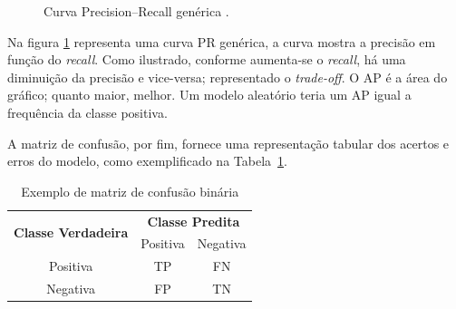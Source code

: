 \documentclass[
    12pt,                %
    openright,           %
    oneside,             %
    a4paper,             %
    brazil               %
]{abntex2}
\begin{document}
\begin{figure}[H]
    \centering
    \caption{Curva Precision–Recall genérica .}
    \label{fig:pr_curve_nv}
\end{figure}


Na figura \ref{fig:pr_curve_nv} representa uma curva PR genérica, a curva mostra a precisão em função do \textit{recall}. Como ilustrado,
conforme aumenta-se o \textit{recall}, há uma diminuição da precisão e vice-versa; representado o \textit{trade-off}. O AP é a área do gráfico; quanto
maior, melhor. Um modelo aleatório teria um AP igual a frequência da classe positiva.

A matriz de confusão, por fim, fornece uma representação tabular dos acertos e erros do modelo, como exemplificado na Tabela~\ref{tab:matriz_confusao}.

\begin{table}[H]
\centering
\caption{Exemplo de matriz de confusão binária}
\label{tab:matriz_confusao}
\begin{tabular}{|c|c|c|}
\hline
\multirow{2}{*}{\textbf{Classe Verdadeira}} & \multicolumn{2}{c|}{\textbf{Classe Predita}} \\ \cline{2-3} 
 & Positiva & Negativa \\ \hline
Positiva & TP & FN \\ \hline
Negativa & FP & TN \\ \hline
\end{tabular}
\end{table}
\end{document}
